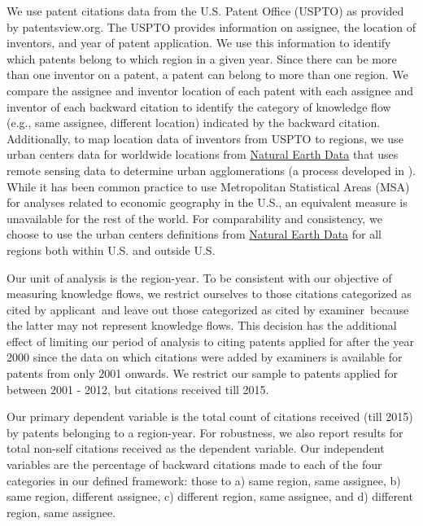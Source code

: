 \documentclass[parskip=full,12pt,letterpaper]{article}
\begin{document}
We use patent citations data from the U.S. Patent Office (USPTO) as provided by patentsview.org. The USPTO provides information on assignee, the location of inventors, and year of patent application. We use this information to identify which patents belong to which region in a given year. Since there can be more than one inventor on a patent, a patent can belong to more than one region. We compare the assignee and inventor location of each patent with each assignee and inventor of each backward citation  to identify the category of knowledge flow (e.g., same assignee, different location) indicated by the backward citation. Additionally, to map location data of inventors from USPTO to regions, we use urban centers data for worldwide locations from \href{http://www.naturalearthdata.com/downloads/10m-cultural-vectors/}{Natural Earth Data} that uses remote sensing data to determine urban agglomerations (a process developed in \citet*{Schneider2003}).  While it has been common practice to use Metropolitan Statistical Areas (MSA) for analyses related to economic geography in the U.S., an equivalent measure is unavailable for the rest of the world. For comparability and consistency, we choose to use the urban centers definitions from \href{http://www.naturalearthdata.com/downloads/10m-cultural-vectors/}{Natural Earth Data} for all regions both within U.S. and outside U.S. \par
Our unit of analysis is the region-year. To be consistent with our objective of measuring knowledge flows, we restrict ourselves to those citations categorized as \textquotesingle cited by applicant\textquotesingle \ and leave out those categorized as \textquotesingle cited by examiner\textquotesingle \ because the latter may not represent knowledge flows. This decision has the additional effect of limiting our period of analysis to citing patents applied for after the year 2000 since the data on which citations were added by examiners is available for patents from only 2001 onwards. We restrict our sample to patents applied for between 2001 - 2012, but citations received till 2015. \par
Our primary dependent variable is the  total count of citations received (till 2015) by patents belonging to a region-year. For robustness, we also report results for total non-self citations received as the dependent variable. Our independent variables are the percentage of backward citations made to each of the four categories in our defined framework: those to a) same region, same assignee, b) same region, different assignee, c) different region, same assignee, and d) different region, same assignee. \par
\end{document}

